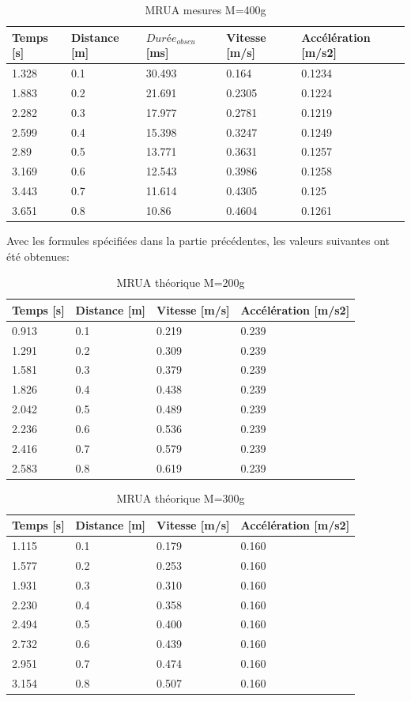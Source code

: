 \begin{table}[ht]
    \centering
    \caption[MRUA mesures M=400g]{MRUA mesures M=400g}
    \begin{tabular}{|l|l|l|l|l|}
	\hline
	Temps [s]	&Distance [m]	&$Durée_{obscu}$ [ms]	&Vitesse [m/s]	&Accélération [m/s2]\\
	\hline
	1.328	&0.1	&30.493	&0.164	&0.1234 \\
	1.883	&0.2	&21.691	&0.2305	&0.1224 \\
	2.282	&0.3	&17.977	&0.2781	&0.1219 \\
	2.599	&0.4	&15.398	&0.3247	&0.1249 \\
	2.89	&0.5	&13.771	&0.3631	&0.1257 \\
	3.169	&0.6	&12.543	&0.3986	&0.1258 \\
	3.443	&0.7	&11.614	&0.4305	&0.125  \\
	3.651	&0.8	&10.86	&0.4604	&0.1261 \\
	\hline
    \end{tabular}
\end{table}

\newpage

Avec les formules spécifiées dans la partie précédentes, les valeurs suivantes ont été obtenues:

\begin{table}[ht]
    \centering
    \caption[MRUA théorique M=200g]{MRUA théorique M=200g}
    \begin{tabular}{|l|l|l|l|}
	\hline
	Temps [s]	&Distance [m]	&Vitesse [m/s]	&Accélération [m/s2]\\
	\hline
	0.913	&0.1	&0.219	&0.239 \\
	1.291	&0.2	&0.309	&0.239 \\
	1.581	&0.3	&0.379	&0.239 \\
	1.826	&0.4	&0.438	&0.239 \\
	2.042	&0.5	&0.489	&0.239 \\
	2.236	&0.6	&0.536	&0.239 \\
	2.416	&0.7	&0.579	&0.239 \\
	2.583	&0.8	&0.619	&0.239 \\
	\hline
    \end{tabular}
\end{table}

\begin{table}[ht]
    \centering
    \caption[MRUA théorique M=300g]{MRUA théorique M=300g}
    \begin{tabular}{|l|l|l|l|}
	\hline
	Temps [s]	&Distance [m]	&Vitesse [m/s]	&Accélération [m/s2]\\
	\hline
	1.115	&0.1	&0.179	&0.160 \\
	1.577	&0.2	&0.253	&0.160 \\
	1.931	&0.3	&0.310	&0.160 \\
	2.230	&0.4	&0.358	&0.160 \\
	2.494	&0.5	&0.400	&0.160 \\
	2.732	&0.6	&0.439	&0.160 \\
	2.951	&0.7	&0.474	&0.160 \\
	3.154	&0.8	&0.507	&0.160 \\
	\hline
    \end{tabular}
\end{table}

